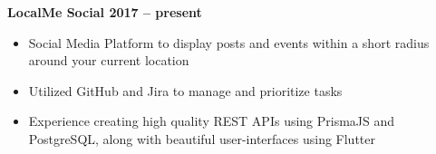 \textbf{{LocalMe Social} \hfill 2017 -- present} \par
\begin{itemize}
	\item Social Media Platform to display posts and events within a short radius around your current location
    \item Utilized GitHub and Jira to manage and prioritize tasks
    \item Experience creating high quality REST APIs using PrismaJS and PostgreSQL, along with beautiful user-interfaces using Flutter
\end{itemize}\vspace{0.1cm}\par